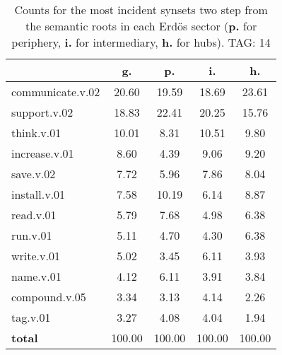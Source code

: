 \begin{table}[h!]
\begin{center}
\begin{tabular}{| l || c | c | c | c |}\hline
 & {\bf g.} & {\bf p.} & {\bf i.} & {\bf h.} \\\hline\hline
communicate.v.02 & 20.60  & 19.59  & 18.69  & 23.61 \\\hline
support.v.02 & 18.83  & 22.41  & 20.25  & 15.76 \\\hline
think.v.01 & 10.01  & 8.31  & 10.51  & 9.80 \\\hline
increase.v.01 & 8.60  & 4.39  & 9.06  & 9.20 \\\hline
save.v.02 & 7.72  & 5.96  & 7.86  & 8.04 \\\hline
install.v.01 & 7.58  & 10.19  & 6.14  & 8.87 \\\hline
read.v.01 & 5.79  & 7.68  & 4.98  & 6.38 \\\hline
run.v.01 & 5.11  & 4.70  & 4.30  & 6.38 \\\hline
write.v.01 & 5.02  & 3.45  & 6.11  & 3.93 \\\hline
name.v.01 & 4.12  & 6.11  & 3.91  & 3.84 \\\hline
compound.v.05 & 3.34  & 3.13  & 4.14  & 2.26 \\\hline
tag.v.01 & 3.27  & 4.08  & 4.04  & 1.94 \\\hline\hline
{{\bf total}} & 100.00  & 100.00  & 100.00  & 100.00 \\\hline
\end{tabular}
\caption{Counts for the most incident synsets two step from the semantic roots in each Erd\"os sector ({\bf p.} for periphery, {\bf i.} for intermediary, {\bf h.} for hubs). TAG: 14}
\end{center}
\end{table}
